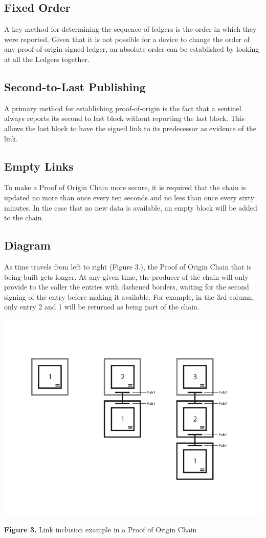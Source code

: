\documentclass{article}
\begin{document}
\subsection {Fixed Order}
A key method for determining the sequence of ledgers is the order in which they were reported. Given that it is not possible for a device to change the order of any \Gls{proof-of-origin} signed ledger, an absolute order can be established by looking at all the Ledgers together.

\subsection {Second-to-Last Publishing}
A primary method for establishing \Gls{proof-of-origin} is the fact that a \Gls{sentinel} always reports its second to last block without reporting the last block. This allows the last block to have the signed link to its predecessor as evidence of the link.

\subsection {Empty Links}
To make a Proof of Origin Chain more secure, it is required that the chain is updated no more than once every ten seconds and no less than once every sixty minutes. In the case that no new data is available, an empty block will be added to the chain.

\subsection {Diagram}
As time travels from left to right (Figure 3.), the Proof of Origin Chain that is being built gets longer. At any given time, the producer of the chain will only provide to the caller the entries with darkened borders, waiting for the second signing of the entry before making it available. For example, in the 3rd column, only entry 2 and 1 will be returned as being part of the chain.

\includegraphics[width=\textwidth] {proofoforigin}
\begin{center}\textbf{Figure 3.}  Link inclusion example in a Proof of Origin Chain
\end{center}
\end{document}
